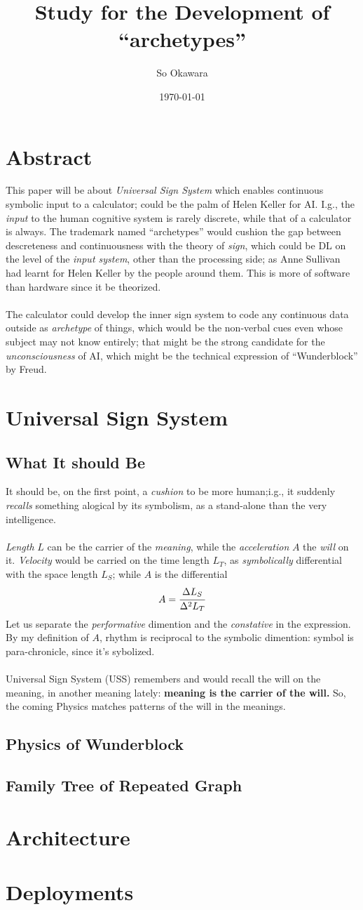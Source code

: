 \documentclass[a4paper, twocolumn,10pt]{article}
\author{So Okawara}
\date{\today}
\title{Study for the Development of ``archetypes''}
\begin{document}
\maketitle
\section{Abstract}
This paper will be about \emph{Universal Sign System} which enables continuous symbolic input to a calculator; could be the palm of Helen Keller for AI. I.g., the \emph{input} to the human cognitive system is rarely discrete, while that of a calculator is always. The trademark named ``archetypes'' would cushion the gap between descreteness and continuousness with the theory of \emph{sign}, which could be DL on the level of the \emph{input system}, other than the processing side; as Anne Sullivan had learnt for Helen Keller by the people around them. This is more of software than hardware since it be theorized.\\\\ The calculator could develop the inner sign system to code any continuous data outside as \emph{archetype} of things, which would be the non-verbal cues even whose subject may not know entirely; that might be the strong candidate for the \emph{unconsciousness} of AI, which might be the technical expression of ``Wunderblock'' by Freud.
\section{Universal Sign System}
\subsection{What It should Be}
It should be, on the first point, a \emph{cushion} to be more human;i.g., it suddenly \emph{recalls} something alogical by its symbolism, as a stand-alone than the very intelligence.\\\\
\emph{Length} $L$ can be the carrier of the \emph{meaning}, while the \emph{acceleration} $A$ the \emph{will} on it. \emph{Velocity} would be carried on the time length $L_T$, as \emph{symbolically} differential with the space length $L_S$; while $A$ is the differential
\[ A = \cfrac{\Delta L_S}{\Delta^2 L_T}\]
Let us separate the \emph{performative} dimention and the \emph{constative} in the expression. By my definition of $A$, rhythm is reciprocal to the symbolic dimention: symbol is para-chronicle, since it's sybolized.\\\\
Universal Sign System (USS) remembers and would recall the will on the meaning, in another meaning lately: \textbf{meaning is the carrier of the will.} So, the coming Physics matches patterns of the will in the meanings.
\subsection{Physics of Wunderblock}
\subsection{Family Tree of Repeated Graph}
\section{Architecture}
\section{Deployments}
\end{document}
